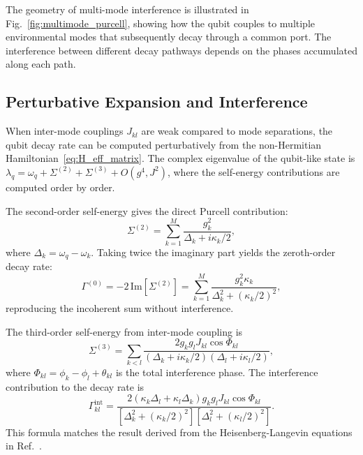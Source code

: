 \documentclass[reprint, floatfix, superscriptaddress, amsmath, amssymb, longbibliography]{revtex4-2}
\begin{document}
The geometry of multi-mode interference is illustrated in Fig.~\ref{fig:multimode_purcell}, showing how the qubit couples to multiple environmental modes that subsequently decay through a common port. The interference between different decay pathways depends on the phases accumulated along each path.

\subsection{Perturbative Expansion and Interference}
\label{sec:perturbative_expansion}

When inter-mode couplings $J_{kl}$ are weak compared to mode separations, the qubit decay rate can be computed perturbatively from the non-Hermitian Hamiltonian~\eqref{eq:H_eff_matrix}. The complex eigenvalue of the qubit-like state is $\lambda_q = \omega_q + \Sigma^{(2)} + \Sigma^{(3)} + O(g^4, J^2)$, where the self-energy contributions are computed order by order.

The second-order self-energy gives the direct Purcell contribution:
\begin{equation}
\Sigma^{(2)} = \sum_{k=1}^{M} \frac{g_k^2}{\Delta_k + i\kappa_k/2},
\label{eq:Sigma_2}
\end{equation}
where $\Delta_k = \omega_q - \omega_k$. Taking twice the imaginary part yields the zeroth-order decay rate:
\begin{equation}
\Gamma^{(0)} = -2\,\mathrm{Im}[\Sigma^{(2)}] = \sum_{k=1}^{M} \frac{g_k^2 \kappa_k}{\Delta_k^2 + (\kappa_k/2)^2},
\label{eq:Gamma_0}
\end{equation}
reproducing the incoherent sum without interference.

The third-order self-energy from inter-mode coupling is~\cite{BakrPurcell2025}
\begin{equation}
\Sigma^{(3)} = \sum_{k < l} \frac{2 g_k g_l J_{kl} \cos\Phi_{kl}}{(\Delta_k + i\kappa_k/2)(\Delta_l + i\kappa_l/2)},
\label{eq:Sigma_3}
\end{equation}
where $\Phi_{kl} = \phi_k - \phi_l + \theta_{kl}$ is the total interference phase. The interference contribution to the decay rate is
\begin{equation}
\Gamma_{kl}^{\mathrm{int}} = \frac{2(\kappa_k\Delta_l + \kappa_l\Delta_k) g_k g_l J_{kl} \cos\Phi_{kl}}{[\Delta_k^2 + (\kappa_k/2)^2][\Delta_l^2 + (\kappa_l/2)^2]}.
\label{eq:Gamma_kl_int}
\end{equation}
This formula matches the result derived from the Heisenberg-Langevin equations in Ref.~\cite{BakrPurcell2025}.
\end{document}
